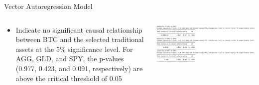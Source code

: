     \begin{frame}{Vector Autoregression Model}
        \begin{columns}
        \begin{column}{0.5\textwidth}
        \begin{itemize}
            \item<1->Indicate no significant causal relationship between BTC and the selected traditional assets at the 5\% significance level. For AGG, GLD, and SPY, the p-values (0.977, 0.423, and 0.091, respectively) are above the critical threshold of 0.05
            
        \end{itemize}
        \end{column}
        \begin{column}{0.5\textwidth}  %
            \begin{center}
             \includegraphics[width=\textwidth]{../../figure/var.png}
             \end{center}
        \end{column}
        \end{columns}
    \end{frame}
